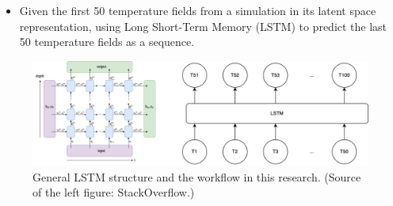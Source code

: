{\begin{itemize}
    \item Given the first 50 temperature fields from a simulation in its latent space representation, using Long Short-Term Memory (LSTM) to predict the last 50 temperature fields as a sequence.

\end{itemize}

\begin{figure}[H]
    \centering
    \includegraphics[width=0.8\linewidth]{figures/LSTM_workflow.png}
    \caption{General LSTM structure and the workflow in this research. (Source of the left figure: StackOverflow.)}
\end{figure}
}

